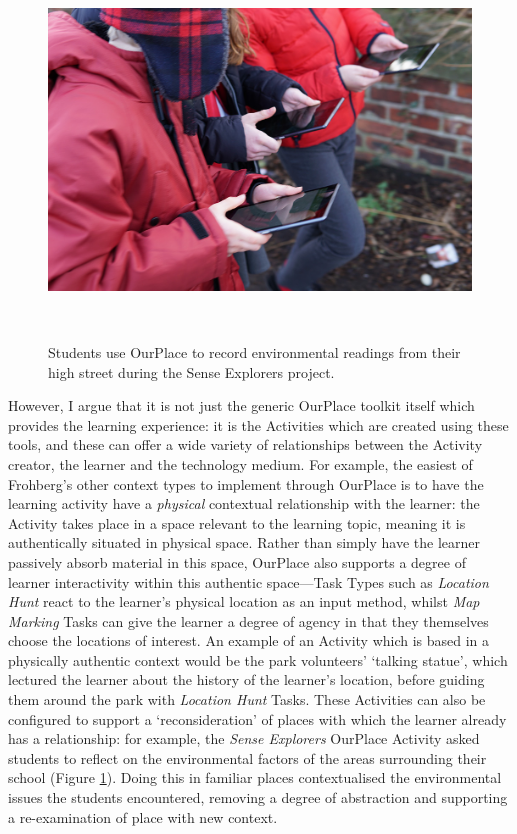 \begin{figure}
\centering
  \includegraphics[width=0.85\columnwidth]{images/chapter09/senseExplorers.jpg}
  \caption[Students use OurPlace to record environmental readings from their high street]{Students use OurPlace to record environmental readings from their high street during the Sense Explorers project.}~\label{fig:senseExplorersHighSt}
\end{figure}

However, I argue that it is not just the generic OurPlace toolkit itself which provides the learning experience: it is the Activities which are created using these tools, and these can offer a wide variety of relationships between the Activity creator, the learner and the technology medium. For example, the easiest of Frohberg's other context types to implement through OurPlace is to have the learning activity have a \textit{physical} contextual relationship with the learner: the Activity takes place in a space relevant to the learning topic, meaning it is authentically situated in physical space. Rather than simply have the learner passively absorb material in this space, OurPlace also supports a degree of learner interactivity within this authentic space---Task Types such as \textit{Location Hunt} react to the learner's physical location as an input method, whilst \textit{Map Marking} Tasks can give the learner a degree of agency in that they themselves choose the locations of interest. An example of an Activity which is based in a physically authentic context would be the park volunteers' `talking statue', which lectured the learner about the history of the learner's location, before guiding them around the park with \textit{Location Hunt} Tasks. These Activities can also be configured to support a `reconsideration' of places with which the learner already has a relationship: for example, the \textit{Sense Explorers} OurPlace Activity asked students to reflect on the environmental factors of the areas surrounding their school (Figure \ref{fig:senseExplorersHighSt}). Doing this in familiar places contextualised the environmental issues the students encountered, removing a degree of abstraction and supporting a re-examination of place with new context.

